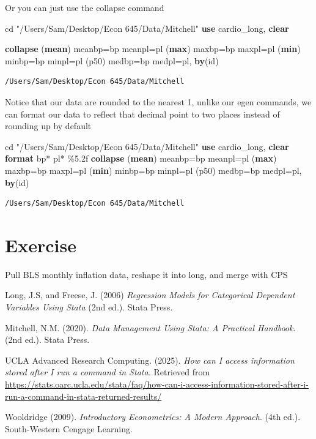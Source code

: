 \documentclass[
]{book}
\newenvironment{Shaded}{\begin{snugshade}}{\end{snugshade}}
\newcommand{\FunctionTok}[1]{\textcolor[rgb]{0.13,0.29,0.53}{\textbf{#1}}}
\newcommand{\KeywordTok}[1]{\textcolor[rgb]{0.13,0.29,0.53}{\textbf{#1}}}
\newcommand{\NormalTok}[1]{#1}
\newcommand{\StringTok}[1]{\textcolor[rgb]{0.31,0.60,0.02}{#1}}
\begin{document}
Or you can just use the collapse command

\begin{Shaded}
\begin{Highlighting}[]
\NormalTok{cd }\StringTok{"/Users/Sam/Desktop/Econ 645/Data/Mitchell"}
\KeywordTok{use}\NormalTok{ cardio\_long, }\KeywordTok{clear}

\KeywordTok{collapse}\NormalTok{ (}\KeywordTok{mean}\NormalTok{) meanbp=bp meanpl=pl (}\FunctionTok{max}\NormalTok{) maxbp=bp maxpl=pl (}\FunctionTok{min}\NormalTok{) minbp=bp minpl=pl (p50) medbp=bp medpl=pl, }\KeywordTok{by}\NormalTok{(id)}
\end{Highlighting}
\end{Shaded}

\begin{verbatim}
/Users/Sam/Desktop/Econ 645/Data/Mitchell
\end{verbatim}

Notice that our data are rounded to the nearest 1, unlike our egen commands, we can format our data to reflect that decimal point to two places instead of rounding up by default

\begin{Shaded}
\begin{Highlighting}[]
\NormalTok{cd }\StringTok{"/Users/Sam/Desktop/Econ 645/Data/Mitchell"}
\KeywordTok{use}\NormalTok{ cardio\_long, }\KeywordTok{clear}
\KeywordTok{format}\NormalTok{ bp* pl* \%5.2f}
\KeywordTok{collapse}\NormalTok{ (}\KeywordTok{mean}\NormalTok{) meanbp=bp meanpl=pl (}\FunctionTok{max}\NormalTok{) maxbp=bp maxpl=pl (}\FunctionTok{min}\NormalTok{) minbp=bp minpl=pl (p50) medbp=bp medpl=pl, }\KeywordTok{by}\NormalTok{(id)}
\end{Highlighting}
\end{Shaded}

\begin{verbatim}
/Users/Sam/Desktop/Econ 645/Data/Mitchell
\end{verbatim}

\section{Exercise}\label{exercise}

Pull BLS monthly inflation data, reshape it into long, and merge with CPS

Long, J.S, and Freese, J. (2006) \emph{Regression Models for Categorical Dependent Variables Using Stata} (2nd ed.). Stata Press.

Mitchell, N.M. (2020). \emph{Data Management Using Stata: A Practical Handbook}. (2nd ed.). Stata Press.

UCLA Advanced Research Computing. (2025). \emph{How can I access information stored after I run a command in Stata.} Retrieved from \url{https://stats.oarc.ucla.edu/stata/faq/how-can-i-access-information-stored-after-i-run-a-command-in-stata-returned-results/}

Wooldridge (2009). \emph{Introductory Econometrics: A Modern Approach}. (4th ed.). South-Western Cengage Learning.


\end{document}
